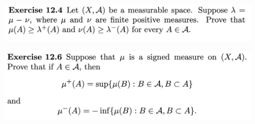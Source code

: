 \newpage
\begin{mdframed}
\includegraphics[width=400pt]{img/analysis--berkeley-202a-hw10-8336.png}
\end{mdframed}

\newpage
\begin{mdframed}
\includegraphics[width=400pt]{img/analysis--berkeley-202a-hw10-0220.png}
\end{mdframed}
